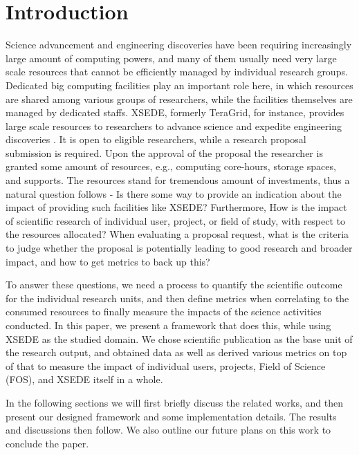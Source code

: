 \section{Introduction}

Science advancement and engineering discoveries have been requiring increasingly large amount of computing powers, and many of them usually need very large scale resources that cannot be efficiently managed by individual research groups. Dedicated big computing facilities play an important role here, in which resources are shared among various groups of researchers, while the facilities themselves are managed by dedicated staffs. XSEDE, formerly TeraGrid, for instance, provides large scale resources to researchers to advance science and expedite engineering discoveries \cite{www-xsede}. It is open to eligible researchers, while a research proposal submission is required. Upon the approval of the proposal the researcher is granted some amount of resources, e.g., computing core-hours, storage spaces, and supports. The resources stand for tremendous amount of investments, thus a natural question follows - Is there some way to provide an indication about the impact of providing such facilities like XSEDE? Furthermore, How is the impact of scientific research of individual user, project, or field of study, with respect to the resources allocated? When evaluating a proposal request, what is the criteria to judge whether the proposal is potentially leading to good research and broader impact, and how to get metrics to back up this?

To answer these questions, we need a process to quantify the scientific outcome for the individual research units, and then define metrics when correlating to the consumed resources to finally measure the impacts of the science activities conducted. In this paper, we present a framework that does this, while using XSEDE as the studied domain. We chose scientific publication as the base unit of the research output, and obtained data as well as derived various metrics on top of that to measure the impact of individual users, projects, Field of Science (FOS), and XSEDE itself in a whole.

In the following sections we will first briefly discuss the related works, and then present our designed framework and some implementation details. The results and discussions then follow. We also outline our future plans on this work to conclude the paper.

